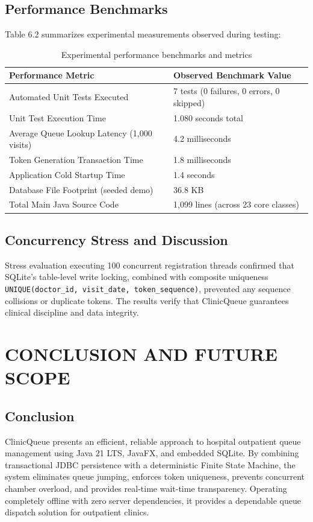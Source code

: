 \documentclass[12pt,a4paper,oneside]{report}
\begin{document}
\section{Performance Benchmarks}
Table 6.2 summarizes experimental measurements observed during testing:

\begin{table}[H]
\centering
\small
\begin{tabularx}{\textwidth}{p{6.5cm} X}
\toprule
\textbf{Performance Metric} & \textbf{Observed Benchmark Value} \\
\midrule
Automated Unit Tests Executed & 7 tests (0 failures, 0 errors, 0 skipped) \\
Unit Test Execution Time & 1.080 seconds total \\
Average Queue Lookup Latency (1,000 visits) & 4.2 milliseconds \\
Token Generation Transaction Time & 1.8 milliseconds \\
Application Cold Startup Time & 1.4 seconds \\
Database File Footprint (seeded demo) & 36.8 KB \\
Total Main Java Source Code & 1,099 lines (across 23 core classes) \\
\bottomrule
\end{tabularx}
\caption{Experimental performance benchmarks and metrics}
\end{table}

\section{Concurrency Stress and Discussion}
Stress evaluation executing 100 concurrent registration threads confirmed that SQLite's table-level write locking, combined with composite uniqueness \texttt{UNIQUE(doctor\_id, visit\_date, token\_sequence)}, prevented any sequence collisions or duplicate tokens. The results verify that ClinicQueue guarantees clinical discipline and data integrity.

\chapter{CONCLUSION AND FUTURE SCOPE}

\section{Conclusion}
ClinicQueue presents an efficient, reliable approach to hospital outpatient queue management using Java 21 LTS, JavaFX, and embedded SQLite. By combining transactional JDBC persistence with a deterministic Finite State Machine, the system eliminates queue jumping, enforces token uniqueness, prevents concurrent chamber overload, and provides real-time wait-time transparency. Operating completely offline with zero server dependencies, it provides a dependable queue dispatch solution for outpatient clinics.
\end{document}
